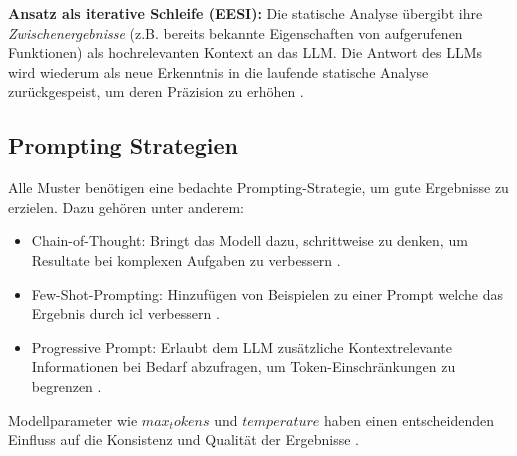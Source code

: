 \textbf{Ansatz als iterative Schleife (EESI):} Die statische Analyse übergibt ihre \textit{Zwischenergebnisse} (z.B. bereits bekannte Eigenschaften von aufgerufenen Funktionen) als hochrelevanten Kontext an das LLM. Die Antwort des LLMs wird wiederum als neue Erkenntnis in die laufende statische Analyse zurückgespeist, um deren Präzision zu erhöhen \cite{chapmanInterleavingStaticAnalysis2024}.


\subsection{Prompting Strategien}\label{sec:prompting}

Alle Muster benötigen eine bedachte Prompting-Strategie, um gute Ergebnisse zu erzielen. Dazu gehören unter anderem:

\begin{itemize}

\item Chain-of-Thought: Bringt das Modell dazu, schrittweise zu denken, um Resultate bei komplexen Aufgaben zu verbessern \cite{liEnhancingStaticAnalysis2024}.
\item Few-Shot-Prompting: Hinzufügen von Beispielen zu einer Prompt welche das  Ergebnis durch \ac{icl} verbessern \cite{khareUnderstandingEffectivenessLarge2024}.
\item Progressive Prompt: Erlaubt dem LLM zusätzliche Kontextrelevante Informationen bei Bedarf abzufragen, um Token-Einschränkungen zu begrenzen \cite{liEnhancingStaticAnalysis2024}.

\end{itemize}

Modellparameter wie $max_tokens$ und $temperature$ haben einen entscheidenden Einfluss auf die Konsistenz und Qualität der Ergebnisse \cite{wagnerEffectiveComplementarySecurity2025}.
